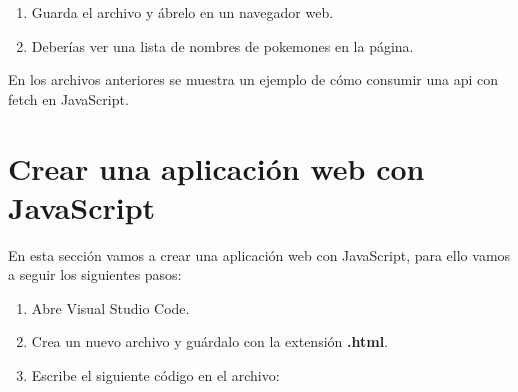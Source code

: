 \documentclass[
  a4paper,
  DIV=11,
  numbers=noendperiod,
  onepage,
  openany]{scrreprt}
\begin{document}
\begin{enumerate}
\def\labelenumi{\arabic{enumi}.}
\setcounter{enumi}{4}
\item
  Guarda el archivo y ábrelo en un navegador web.
\item
  Deberías ver una lista de nombres de pokemones en la página.
\end{enumerate}

En los archivos anteriores se muestra un ejemplo de cómo consumir una
api con fetch en JavaScript.

\section{Crear una aplicación web con
JavaScript}\label{crear-una-aplicaciuxf3n-web-con-javascript}

En esta sección vamos a crear una aplicación web con JavaScript, para
ello vamos a seguir los siguientes pasos:

\begin{enumerate}
\def\labelenumi{\arabic{enumi}.}
\item
  Abre Visual Studio Code.
\item
  Crea un nuevo archivo y guárdalo con la extensión \textbf{.html}.
\item
  Escribe el siguiente código en el archivo:
\end{enumerate}
\end{document}
